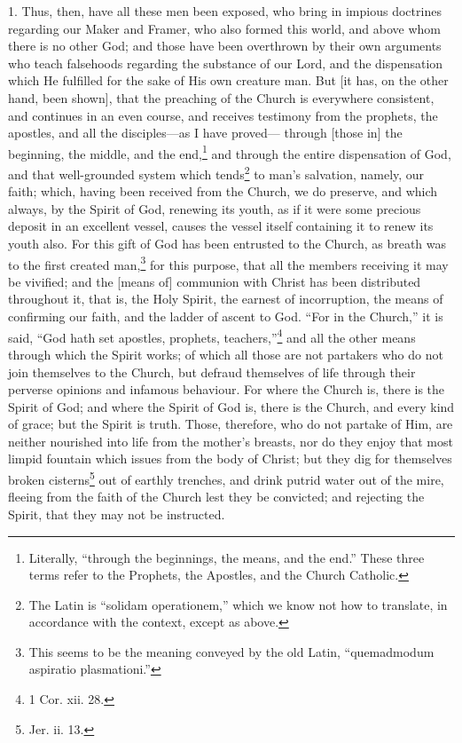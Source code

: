 1. Thus, then, have all these men been exposed, who bring in impious doctrines regarding our Maker and Framer, who also formed this world, and above whom there is no other God; and those have been overthrown by their own arguments who teach falsehoods regarding the substance of our Lord, and the dispensation which He fulfilled for the sake of His own creature man. But [it has, on the other hand, been shown], that the preaching of the Church is everywhere consistent, and continues in an even course, and receives testimony from the prophets, the apostles, and all the disciples—as I have proved— through [those in] the beginning, the middle, and the end,\footnote{Literally, “through the beginnings, the means, and the end.” These three terms refer to the Prophets, the Apostles, and the Church Catholic.} and through the entire dispensation of God, and that well-grounded system which tends\footnote{The Latin is “solidam operationem,” which we know not how to translate, in accordance with the context, except as above.} to man’s salvation, namely, our faith; which, having been received from the Church, we do preserve, and which always, by the Spirit of God, renewing its youth, as if it were some precious deposit in an excellent vessel, causes the vessel itself containing it to renew its youth also. For this gift of God has been entrusted to the Church, as breath was to the first created man,\footnote{This seems to be the meaning conveyed by the old Latin, “quemadmodum aspiratio plasmationi.”} for this purpose, that all the members receiving it may be vivified; and the [means of] communion with Christ has been distributed throughout it, that is, the Holy Spirit, the earnest of incorruption, the means of confirming our faith, and the ladder of ascent to God. “For in the Church,” it is said, “God hath set apostles, prophets, teachers,”\footnote{1 Cor. xii. 28.} and all the other means through which the Spirit works; of which all those are not partakers who do not join themselves to the Church, but defraud themselves of life through their perverse opinions and infamous behaviour. For where the Church is, there is the Spirit of God; and where the Spirit of God is, there is the Church, and every kind of grace; but the Spirit is truth. Those, therefore, who do not partake of Him, are neither nourished into life from the mother’s breasts, nor do they enjoy that most limpid fountain which issues from the body of Christ; but they dig for themselves broken cisterns\footnote{Jer. ii. 13.} out of earthly trenches, and drink putrid water out of the mire, fleeing from the faith of the Church lest they be convicted; and rejecting the Spirit, that they may not be instructed.


